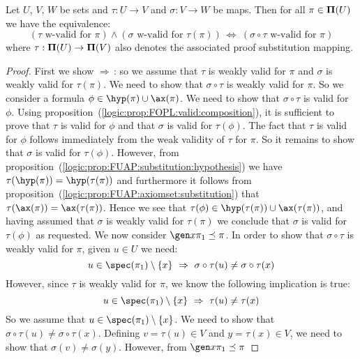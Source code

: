 \begin{prop}\label{logic:prop:FUAP:validsub:composition}
Let $U$, $V$, $W$ be sets and $\tau:U\to V$ and $\sigma:V\to W$ be
maps. Then for all $\pi\in{\bf\Pi}(U)$ we have the equivalence:
\[
    (\mbox{$\tau$ w-valid for $\pi$})\land(\mbox{$\sigma$ w-valid for
    $\tau(\pi)$})\ \Leftrightarrow\ (\mbox{$\sigma\circ\tau$ w-valid for
    $\pi$})
\]
where $\tau:{\bf\Pi}(U)\to{\bf\Pi}(V)$ also denotes the associated
proof substitution mapping.
\end{prop}
\begin{proof}
First we show $\Rightarrow$\,: so we assume that $\tau$ is weakly
valid for $\pi$ and $\sigma$ is weakly valid for $\tau(\pi)$. We
need to show that $\sigma\circ\tau$ is weakly valid for $\pi$. So we
consider a formula $\phi\in\hyp(\pi)\cup\ax(\pi)$. We need to show
that $\sigma\circ\tau$ is valid for $\phi$. Using
proposition~(\ref{logic:prop:FOPL:valid:composition}), it is
sufficient to prove that $\tau$ is valid for $\phi$ and that
$\sigma$ is valid for $\tau(\phi)$. The fact that $\tau$ is valid
for $\phi$ follows immediately from the weak validity of $\tau$ for
$\pi$. So it remains to show that $\sigma$ is valid for
$\tau(\phi)$. However, from
proposition~(\ref{logic:prop:FUAP:substitution:hypothesis}) we have
$\tau(\hyp(\pi))=\hyp(\tau(\pi))$ and furthermore it follows from
proposition~(\ref{logic:prop:FUAP:axiomset:substitution}) that
$\tau(\ax(\pi))=\ax(\tau(\pi))$. Hence we see that
$\tau(\phi)\in\hyp(\tau(\pi))\cup\ax(\tau(\pi))$, and having assumed
that $\sigma$ is weakly valid for $\tau(\pi)$ we conclude that
$\sigma$ is valid for $\tau(\phi)$ as requested. We now consider
$\gen x\pi_{1}\preceq\pi$. In order to show that $\sigma\circ\tau$
is weakly valid for $\pi$, given $u\in U$ we need:
    \begin{equation}\label{logic:eqn:FUAP:validsub:composition:1}
    u\in\spec(\pi_{1})\setminus\{x\}\ \Rightarrow\
    \sigma\circ\tau(u)\neq\sigma\circ\tau(x)
    \end{equation}
However, since $\tau$ is weakly valid for $\pi$, we know the
following implication is true:
    \begin{equation}\label{logic:eqn:FUAP:validsub:composition:2}
    u\in\spec(\pi_{1})\setminus\{x\}\ \Rightarrow\
    \tau(u)\neq\tau(x)
    \end{equation}
So we assume that $u\in\spec(\pi_{1})\setminus\{x\}$. We need to
show that $\sigma\circ\tau(u)\neq\sigma\circ\tau(x)$. Defining
$v=\tau(u)\in V$ and $y=\tau(x)\in V$, we need to show that
$\sigma(v)\neq\sigma(y)$. However, from $\gen x\pi_{1}\preceq\pi$

\end{proof}
